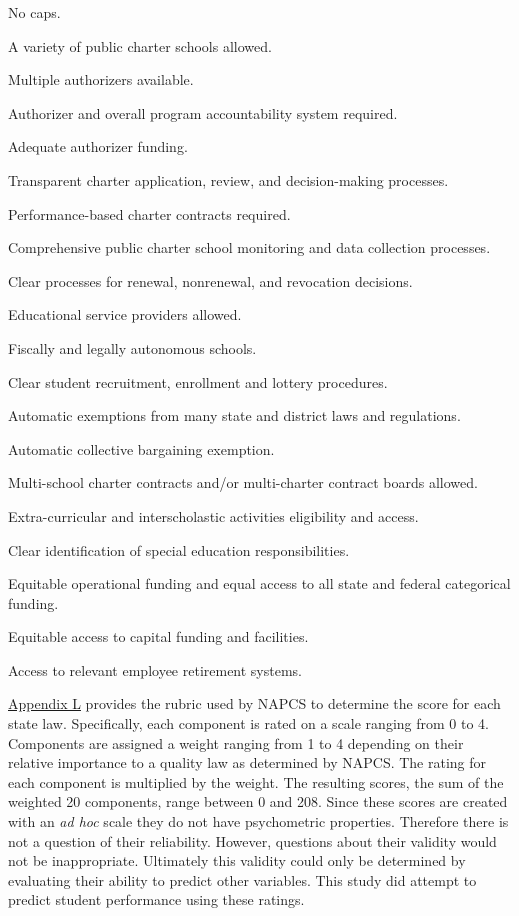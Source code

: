 \documentclass[letterpaper,12pt]{article} %
\renewcommand{\normalsize}{\fontsize{12}{13}\selectfont}
\begin{document}
\begin{singlespace}\normalsize
\begin{enumerate}[noitemsep]
{\it
\item No caps.
\item A variety of public charter schools allowed.
\item Multiple authorizers available.
\item Authorizer and overall program accountability system required.
\item Adequate authorizer funding.
\item Transparent charter application, review, and decision-making processes.
\item Performance-based charter contracts required.
\item Comprehensive public charter school monitoring and data collection processes.
\item Clear processes for renewal, nonrenewal, and revocation decisions.
\item Educational service providers allowed.
\item Fiscally and legally autonomous schools.
\item Clear student recruitment, enrollment and lottery procedures.
\item Automatic exemptions from many state and district laws and regulations.
\item Automatic collective bargaining exemption.
\item Multi-school charter contracts and/or multi-charter contract boards allowed.
\item Extra-curricular and interscholastic activities eligibility and access.
\item Clear identification of special education responsibilities.
\item Equitable operational funding and equal access to all state and federal categorical funding.
\item Equitable access to capital funding and facilities.
\item Access to relevant employee retirement systems.
}
\end{enumerate}
\end{singlespace}

\noindent \hyperref[appendixL]{Appendix L} provides the rubric used by NAPCS to determine the score for each state law. Specifically, each component is rated on a scale ranging from 0 to 4. Components are assigned a weight ranging from 1 to 4 depending on their relative importance to a quality law as determined by NAPCS. The rating for each component is multiplied by the weight. The resulting scores, the sum of the weighted 20 components, range between 0 and 208. Since these scores are created with an \textit{ad hoc} scale they do not have psychometric properties. Therefore there is not a question of their reliability. However, questions about their validity would not be inappropriate. Ultimately this validity could only be determined by evaluating their ability to predict other variables. This study did attempt to predict student performance using these ratings.
\end{document}
